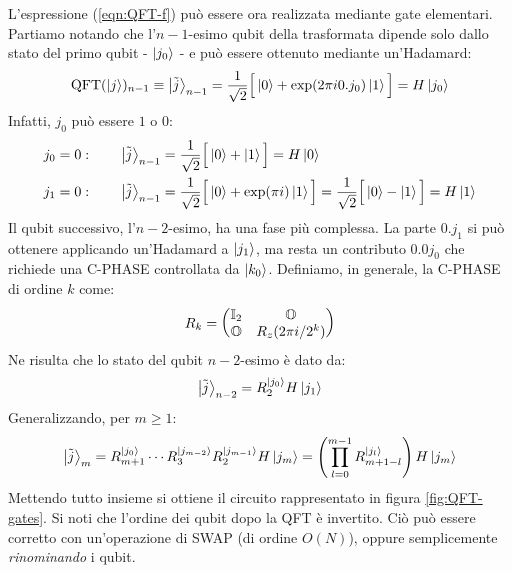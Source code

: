 \documentclass[../../InformazioneQuantistica.tex]{subfiles}
\begin{document}
L'espressione (\ref{eqn:QFT-f}) può essere ora realizzata mediante gate elementari.\\ Partiamo notando che l'$n-1$-esimo qubit della trasformata dipende solo dallo stato del primo qubit - $\Ket{j_0}$ - e può essere ottenuto mediante un'Hadamard:
\begin{align*}
    \operatorname{QFT}(\Ket{j})_{n-1} \equiv \Ket{\tilde{j}}_{n-1} = \frac{1}{\sqrt{2}}\Big[\Ket{0} + \exp(2\pi i 0.j_0) \Ket{1} \Big] = H\Ket{j_0}
\end{align*}
Infatti, $j_0$ può essere $1$ o $0$:
\begin{align*}
    j_0 = 0: \qquad \Ket{\tilde{j}}_{n-1} &= \frac{1}{\sqrt{2}}\Big[\Ket{0} + \Ket{1}\Big] = H\Ket{0}\\
    j_1 = 0: \qquad \Ket{\tilde{j}}_{n-1} &= \frac{1}{\sqrt{2}}\Big[\Ket{0} + \exp(\pi i) \Ket{1}\Big] = \frac{1}{\sqrt{2}}\Big[\Ket{0}-\Ket{1}\Big] = H\Ket{1}
\end{align*}
Il qubit successivo, l'$n-2$-esimo, ha una fase più complessa. La parte $0.j_1$ si può ottenere applicando un'Hadamard a $\Ket{j_1}$, ma resta un contributo $0.0j_0$ che richiede una C-PHASE controllata da $\Ket{k_0}$. Definiamo, in generale, la C-PHASE di ordine $k$ come:
\begin{align*}
R_k = \begin{pmatrix} \mathbb{I}_2 & \mathbb{O}\\
\mathbb{O} & R_z(2\pi i/2^k) \end{pmatrix}
\end{align*}
Ne risulta che lo stato del qubit $n-2$-esimo è dato da:
\begin{align*}
    \Ket{\tilde{j}}_{n-2} = R_2^{\Ket{j_0}} H \Ket{j_1}
\end{align*}
Generalizzando, per $m\geq 1$:
\begin{align*}
    \Ket{\tilde{j}}_{m} = R_{m+1}^{\Ket{j_0}} \cdots R_3^{\Ket{j_{m-2}}} R_2^{\Ket{j_{m-1}}} H \Ket{j_m} = \left(\prod_{l=0}^{m-1} R_{m+1-l}^{\Ket{j_l}} \right) H \Ket{j_m}
\end{align*}
Mettendo tutto insieme si ottiene il circuito rappresentato in figura \ref{fig:QFT-gates}. Si noti che l'ordine dei qubit dopo la QFT è invertito. Ciò può essere corretto con un'operazione di SWAP (di ordine $O(N)$), oppure semplicemente \textit{rinominando} i qubit.
\end{document}
